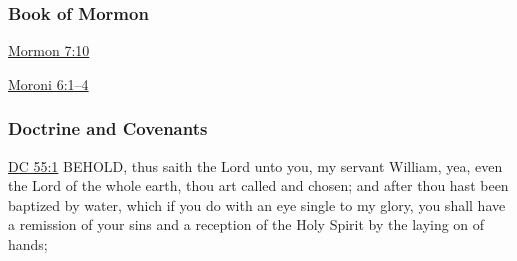 		
	\subsubsection{Book of Mormon} %
		\label{BAPTISM-BOM}
	
		
		\begin{compactdesc}
			\item[{\hyperref[MORMON-7-10]{Mormon 7:10}}]
			\item[{\hyperref[MORONI-6-1]{Moroni 6:1--4}}]
		\end{compactdesc}
		
	\subsubsection{Doctrine and Covenants} %
		\label{BAPTISM-DC}
	
		
		\begin{compactdesc}
			\item[{\hyperref[DC55-1]{DC 55:1}}] BEHOLD, thus saith the Lord unto you, my servant William, yea, even the Lord of the whole earth, thou art called and chosen; and after thou hast been baptized by water, which if you do with an eye single to my glory, you shall have a remission of your sins and a reception of the Holy Spirit by the laying on of hands;
		\end{compactdesc}
		
	
